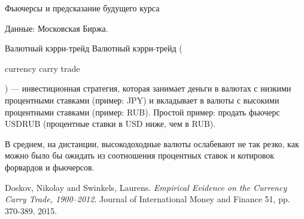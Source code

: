 \documentclass{beamer}
\newcommand{\en}[1]{\begin{otherlanguage}{english}#1\end{otherlanguage}}
\begin{document}
\begin{frame}{Фьючерсы и предсказание будущего курса}
\center
{}

\scriptsize Данные: Московская Биржа.
\end{frame}



\begin{frame}{Валютный кэрри-трейд}
\justify
\alert{Валютный кэрри-трейд} (\en{currency carry trade}) --- инвестиционная стратегия, которая занимает деньги в валютах с низкими процентными ставками (пример: JPY) и вкладывает в валюты с высокими процентными ставками (пример: RUB). Простой пример: продать фьючерс USDRUB (процентные ставки в USD ниже, чем в RUB).

\justify
В среднем, на дистанции, высокодоходные валюты ослабевают не так резко, как можно было бы ожидать из соотношения процентных ставок и котировок форвардов и фьючерсов.

\justify
\en{Doskov, Nikolay and Swinkels, Laurens. \textit{Empirical Evidence on the Currency Carry Trade, 1900--2012}. Journal of International Money and Finance 51, pp. 370-389. 2015.}

\end{frame}
\end{document}
